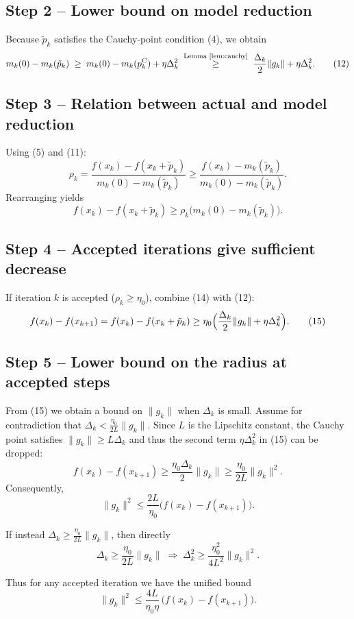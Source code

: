 \documentclass[11pt]{article}
\begin{document}
\subsection*{Step 2 – Lower bound on model reduction}
Because \(\tilde p_k\) satisfies the Cauchy‑point condition (4), we obtain
\[
m_k(0)-m_k(\tilde p_k) 
\;\ge\;
m_k(0)-m_k(p^{\mathrm{C}}_k) +\eta\Delta_k^{2}
\;\stackrel{\text{Lemma~\ref{lem:cauchy}}}{\ge}\;
\frac{\Delta_k}{2}\|g_k\| +\eta\Delta_k^{2}.
\tag{12}
\]

\subsection*{Step 3 – Relation between actual and model reduction}
Using (5) and (11):
\[
\rho_k
= \frac{f(x_k)-f(x_k+\tilde p_k)}{m_k(0)-m_k(\tilde p_k)}
\ge
\frac{f(x_k)-m_k(\tilde p_k)}{m_k(0)-m_k(\tilde p_k)} .
\tag{13}
\]
Rearranging yields
\[
f(x_k)-f(x_k+\tilde p_k)
\ge \rho_k\bigl(m_k(0)-m_k(\tilde p_k)\bigr).
\tag{14}
\]

\subsection*{Step 4 – Accepted iterations give sufficient decrease}
If iteration \(k\) is accepted (\(\rho_k\ge\eta_0\)), combine (14) with (12):
\[
f(x_k)-f(x_{k+1})
= f(x_k)-f(x_k+\tilde p_k)
\ge \eta_0\Bigl(\frac{\Delta_k}{2}\|g_k\|+\eta\Delta_k^{2}\Bigr).
\tag{15}
\]

\subsection*{Step 5 – Lower bound on the radius at accepted steps}
From (15) we obtain a bound on \(\|g_k\|\) when \(\Delta_k\) is small.  
Assume for contradiction that \(\Delta_k<\frac{\eta_0}{2L}\|g_k\|\). Since \(L\) is the Lipschitz constant, the Cauchy point satisfies \(\|g_k\|\ge L\Delta_k\) and thus the second term \(\eta\Delta_k^{2}\) in (15) can be dropped:
\[
f(x_k)-f(x_{k+1})
\ge \frac{\eta_0\Delta_k}{2}\|g_k\|
\ge \frac{\eta_0}{2L}\|g_k\|^{2}.
\tag{16}
\]
Consequently,
\[
\|g_k\|^{2}
\le \frac{2L}{\eta_0}\bigl(f(x_k)-f(x_{k+1})\bigr).
\tag{17}
\]

If instead \(\Delta_k\ge\frac{\eta_0}{2L}\|g_k\|\), then directly
\[
\Delta_k \ge \frac{\eta_0}{2L}\|g_k\|
\;\Longrightarrow\;
\Delta_k^{2} \ge \frac{\eta_0^{2}}{4L^{2}}\|g_k\|^{2}.
\tag{18}
\]

Thus for any accepted iteration we have the unified bound
\[
\|g_k\|^{2}\le
\frac{4L}{\eta_0\eta}\,\bigl(f(x_k)-f(x_{k+1})\bigr).
\tag{19}
\]
\end{document}
